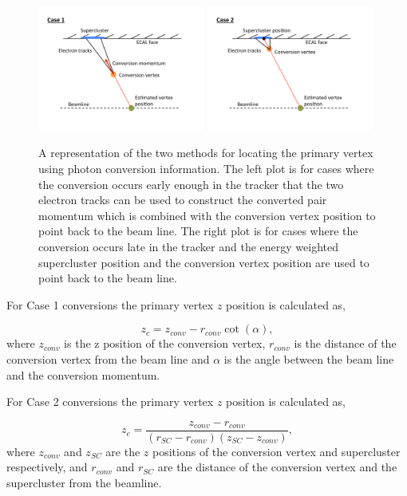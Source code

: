 \begin{figure}
  \includegraphics[width=0.49\textwidth]{ch3_comm_anal_comps/plots/ConversionDiagCase1.pdf}
  \includegraphics[width=0.49\textwidth]{ch3_comm_anal_comps/plots/ConversionDiagCase2.pdf}
  \caption{A representation of the two methods for locating the primary vertex using photon conversion information. The left plot is for cases where the conversion occurs early enough in the tracker that the two electron tracks can be used to construct the converted pair momentum which is combined with the conversion vertex position to point back to the beam line. The right plot is for cases where the conversion occurs late in the tracker and the energy weighted supercluster position and the conversion vertex position are used to point back to the beam line.}
  \label{fig:conv_diags}
\end{figure}

For Case 1 conversions the primary vertex $z$ position is calculated as,

\begin{equation}
  z_{c} = z_{conv} - r_{conv}\cot(\alpha),
\end{equation}
where $z_{conv}$ is the z position of the conversion vertex, $r_{conv}$ is the distance of the conversion vertex from the beam line and $\alpha$ is the angle between the beam line and the conversion momentum.

For Case 2 conversions the primary vertex $z$ position is calculated as,

\begin{equation}
  z_{c} = \frac{z_{conv}-r_{conv}}{(r_{SC}-r_{conv})(z_{SC}-z_{conv})},
\end{equation}
where $z_{conv}$ and $z_{SC}$ are the $z$ positions of the conversion vertex and supercluster respectively, and $r_{conv}$ and $r_{SC}$ are the distance of the conversion vertex and the supercluster from the beamline.

